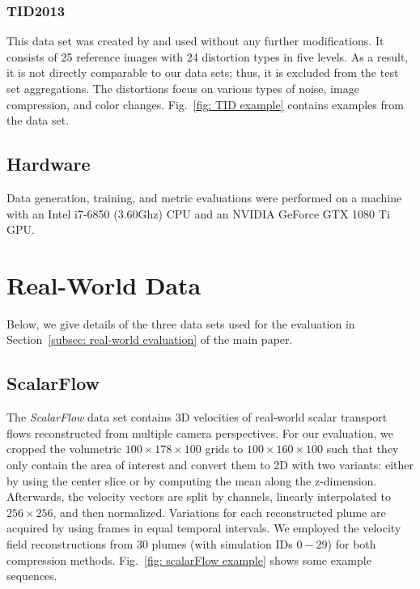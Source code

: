 \subsubsection*{TID2013}
This data set was created by \citeauthor{ponomarenko2015} and used without any further modifications. It consists of 25 reference images with 24 distortion types in five levels. As a result, it is not directly comparable to our data sets; thus, it is excluded from the test set aggregations. The distortions focus on various types of noise, image compression, and color changes. Fig.~\ref{fig: TID example} contains examples from the data set.

\subsection{Hardware}
Data generation, training, and metric evaluations were performed on a machine with an Intel i7-6850 (3.60Ghz) CPU and an NVIDIA GeForce GTX 1080 Ti GPU.



\section{Real-World Data}  \label{append: real-world data}
Below, we give details of the three data sets used for the evaluation in Section~\ref{subsec: real-world evaluation} of the main paper.

\subsection{ScalarFlow}
The \textit{ScalarFlow} data set \cite{eckert2019} contains 3D velocities of real-world scalar transport flows reconstructed from multiple camera perspectives. For our evaluation, we cropped the volumetric $100\times178\times100$ grids to $100\times160\times100$ such that they only contain the area of interest and convert them to 2D with two variants: either by using the center slice or by computing the mean along the z-dimension. Afterwards, the velocity vectors are split by channels, linearly interpolated to $256\times256$, and then normalized. Variations for each reconstructed plume are acquired by using frames in equal temporal intervals. We employed the velocity field reconstructions from 30 plumes (with simulation IDs $0-29$) for both compression methods. Fig.~\ref{fig: scalarFlow example} shows some example sequences.

